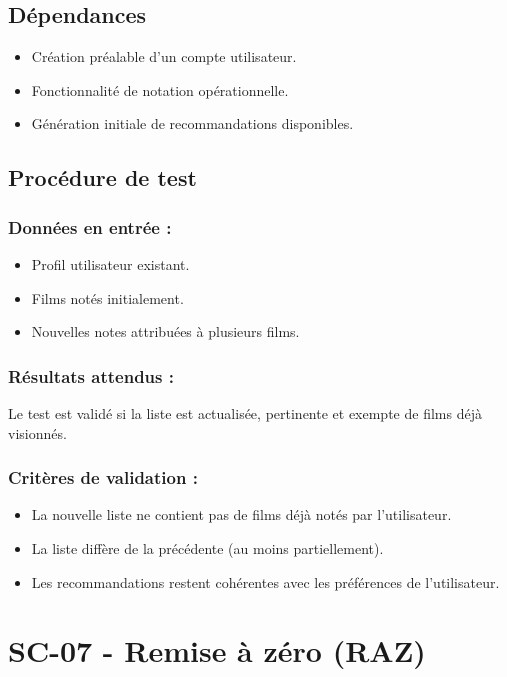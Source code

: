 \documentclass[a4paper,12pt]{report}
\begin{document}
\subsection*{Dépendances}
\begin{itemize}
    \item Création préalable d'un compte utilisateur.
    \item Fonctionnalité de notation opérationnelle.
    \item Génération initiale de recommandations disponibles.
\end{itemize}

\subsection*{Procédure de test}
\subsubsection{Données en entrée :}
\begin{itemize}
    \item Profil utilisateur existant.
    \item Films notés initialement.
    \item Nouvelles notes attribuées à plusieurs films.
\end{itemize}
\subsubsection{Résultats attendus :}
Le test est validé si la liste est actualisée, pertinente et exempte de films déjà visionnés.

\subsubsection{Critères de validation :}
\begin{itemize}
    \item La nouvelle liste ne contient pas de films déjà notés par l'utilisateur.
    \item La liste diffère de la précédente (au moins partiellement).
    \item Les recommandations restent cohérentes avec les préférences de l'utilisateur.
\end{itemize}
\newpage

\section{SC-07 - Remise à zéro (RAZ)}
\label{DU2}
\end{document}
